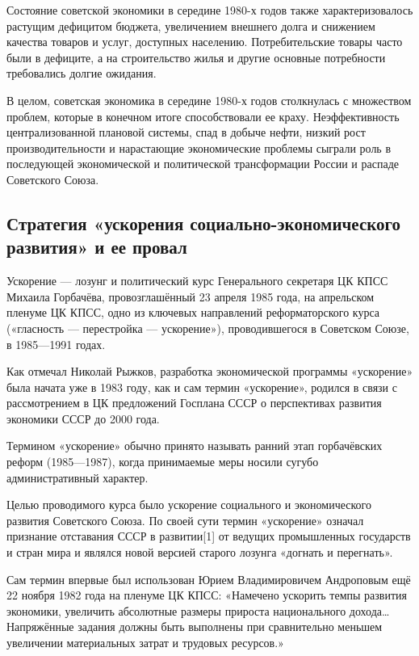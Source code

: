 \documentclass{article}
\begin{document}
\hfill

Состояние советской экономики в середине 1980-х годов также характеризовалось растущим дефицитом бюджета, увеличением внешнего долга и снижением качества товаров и услуг, доступных населению. Потребительские товары часто были в дефиците, а на строительство жилья и другие основные потребности требовались долгие ожидания.

\hfill

В целом, советская экономика в середине 1980-х годов столкнулась с множеством проблем, которые в конечном итоге способствовали ее краху. Неэффективность централизованной плановой системы, спад в добыче нефти, низкий рост производительности и нарастающие экономические проблемы сыграли роль в последующей экономической и политической трансформации России и распаде Советского Союза.

\pagebreak
\subsection{Стратегия «ускорения социально-экономического развития» и ее провал}

Ускорение — лозунг и политический курс Генерального секретаря ЦК КПСС Михаила Горбачёва, провозглашённый 23 апреля 1985 года, на апрельском пленуме ЦК КПСС, одно из ключевых направлений реформаторского курса («гласность — перестройка — ускорение»), проводившегося в Советском Союзе, в 1985—1991 годах.

\hfill

Как отмечал Николай Рыжков, разработка экономической программы «ускорение» была начата уже в 1983 году, как и сам термин «ускорение», родился в связи с рассмотрением в ЦК предложений Госплана СССР о перспективах развития экономики СССР до 2000 года.

\hfill

Термином «ускорение» обычно принято называть ранний этап горбачёвских реформ (1985—1987), когда принимаемые меры носили сугубо административный характер.

\hfill

Целью проводимого курса было ускорение социального и экономического развития Советского Союза. По своей сути термин «ускорение» означал признание отставания СССР в развитии[1] от ведущих промышленных государств и стран мира и являлся новой версией старого лозунга «догнать и перегнать».

Сам термин впервые был использован Юрием Владимировичем Андроповым ещё 22 ноября 1982 года на пленуме ЦК КПСС: «Намечено ускорить темпы развития экономики, увеличить абсолютные размеры прироста национального дохода… Напряжённые задания должны быть выполнены при сравнительно меньшем увеличении материальных затрат и трудовых ресурсов.»
\end{document}
